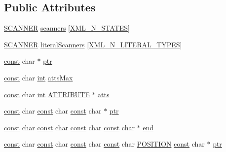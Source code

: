 \subsection*{Public Attributes}
\begin{DoxyCompactItemize}
\item 
\hyperlink{xmltok_8h_a64a2a69dc8f54087bbb1bd09bf66f720}{S\+C\+A\+N\+N\+ER} \hyperlink{structencoding_af15c935d0343018b21e64a166532990e}{scanners} \mbox{[}\hyperlink{xmltok_8h_a716387e9cc55410d572b202955d926ba}{X\+M\+L\+\_\+\+N\+\_\+\+S\+T\+A\+T\+ES}\mbox{]}
\item 
\hyperlink{xmltok_8h_a64a2a69dc8f54087bbb1bd09bf66f720}{S\+C\+A\+N\+N\+ER} \hyperlink{structencoding_a6ad3e1bba280862459c4762dbb10f9e0}{literal\+Scanners} \mbox{[}\hyperlink{xmltok_8h_a26a75ee24f173c281d20b247603b1f24}{X\+M\+L\+\_\+\+N\+\_\+\+L\+I\+T\+E\+R\+A\+L\+\_\+\+T\+Y\+P\+ES}\mbox{]}
\item 
\hyperlink{getopt1_8c_a2c212835823e3c54a8ab6d95c652660e}{const} char $\ast$ \hyperlink{structencoding_ad338493153641b08ca2220ba0518bdb3}{ptr}
\item 
\hyperlink{getopt1_8c_a2c212835823e3c54a8ab6d95c652660e}{const} char \hyperlink{structencoding_a92bcf4f50db1c279fc5eda73472d7202}{int} \hyperlink{structencoding_a7b42e4a6bc0c0969004a6644d01784f2}{atts\+Max}
\item 
\hyperlink{getopt1_8c_a2c212835823e3c54a8ab6d95c652660e}{const} char \hyperlink{structencoding_a92bcf4f50db1c279fc5eda73472d7202}{int} \hyperlink{struct_a_t_t_r_i_b_u_t_e}{A\+T\+T\+R\+I\+B\+U\+TE} $\ast$ \hyperlink{structencoding_a6f0f8a65c19c1b03bfe8b298bdb419ec}{atts}
\item 
\hyperlink{getopt1_8c_a2c212835823e3c54a8ab6d95c652660e}{const} char \hyperlink{getopt1_8c_a2c212835823e3c54a8ab6d95c652660e}{const} char \hyperlink{getopt1_8c_a2c212835823e3c54a8ab6d95c652660e}{const} char $\ast$ \hyperlink{structencoding_aa4291770220296dccdae2caa59d3d10f}{ptr}
\item 
\hyperlink{getopt1_8c_a2c212835823e3c54a8ab6d95c652660e}{const} char \hyperlink{getopt1_8c_a2c212835823e3c54a8ab6d95c652660e}{const} char \hyperlink{getopt1_8c_a2c212835823e3c54a8ab6d95c652660e}{const} char \hyperlink{getopt1_8c_a2c212835823e3c54a8ab6d95c652660e}{const} char $\ast$ \hyperlink{structencoding_ac4aa42001aee7a5583395c922a0d50f5}{end}
\item 
\hyperlink{getopt1_8c_a2c212835823e3c54a8ab6d95c652660e}{const} char \hyperlink{getopt1_8c_a2c212835823e3c54a8ab6d95c652660e}{const} char \hyperlink{getopt1_8c_a2c212835823e3c54a8ab6d95c652660e}{const} char \hyperlink{getopt1_8c_a2c212835823e3c54a8ab6d95c652660e}{const} char \hyperlink{xmltok_8h_acbc9ec28b807eebf9d62149084c952b1}{P\+O\+S\+I\+T\+I\+ON} \hyperlink{getopt1_8c_a2c212835823e3c54a8ab6d95c652660e}{const} char $\ast$ \hyperlink{structencoding_ab8e153eed61327bf8fa793f53ee59e0f}{ptr}

\end{DoxyCompactItemize}
